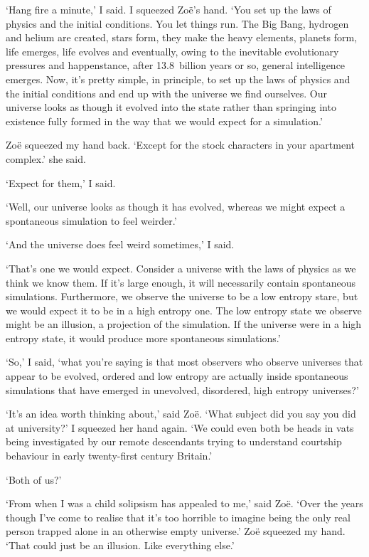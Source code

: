 `Hang fire a minute,' I said. I squeezed Zoë's hand. `You set up
the laws of physics and the initial conditions. You let things run.
The Big Bang, hydrogen and helium are created, stars form, they make the heavy elements,
planets form, life emerges, life evolves and eventually, owing to
the inevitable evolutionary pressures and happenstance, after
13.8~billion years or so, general intelligence emerges. Now, it's
pretty simple, in principle, to set up the laws of physics and the
initial conditions and end up with the universe we find ourselves.
Our universe looks as though it evolved into the state rather than
springing into existence fully formed in the way that we would
expect for a simulation.'

Zoë squeezed my hand back. `Except for the stock characters in
your apartment complex.' she said.

`Expect for them,' I said.

`Well, our universe looks as though it has evolved, whereas we might
expect a spontaneous simulation to feel weirder.'

`And the universe does feel weird sometimes,' I said.

`That's one we would expect. Consider a universe with the laws of
physics as we think we know them. If it's large enough, it will
necessarily contain spontaneous simulations. Furthermore, we observe
the universe to be a low entropy stare, but we would expect it to be in
a high entropy one. The low entropy state we observe might be an
illusion, a projection of the simulation. If the universe were in a
high entropy state, it would produce more spontaneous simulations.'

`So,' I said, `what you're saying is that most observers who observe
universes that appear to be evolved, ordered and low entropy are
actually inside spontaneous simulations that have emerged in
unevolved, disordered, high entropy universes?'

`It's an idea worth thinking about,' said Zoë. `What subject did
you say you did at university?' I squeezed her hand again. `We
could even both be heads in vats being investigated by our remote
descendants trying to understand courtship behaviour in early
twenty-first century Britain.'

`Both of us?'

`From when I was a child solipsism has appealed to me,' said
Zoë. `Over the years though I've come to realise that it's too
horrible to imagine being the only real person trapped alone in an
otherwise empty universe.' Zoë squeezed my hand. `That could
just be an illusion. Like everything else.'

